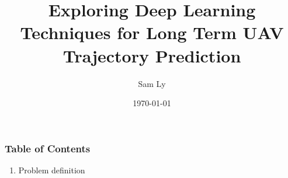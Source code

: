 \documentclass{beamer}
\title[Deep Learning for UAV Trajectory Prediction]{
    Exploring Deep Learning Techniques for Long Term UAV Trajectory Prediction
}
\author{Sam Ly}
\institute{Cal Poly Pomona}
\date{\today}
\begin{document}
\begin{frame}
    \titlepage
\end{frame}

\begin{frame}
    \frametitle{Table of Contents}

    \begin{enumerate}
        \item Problem definition

    \end{enumerate}
\end{frame}
\end{document}
